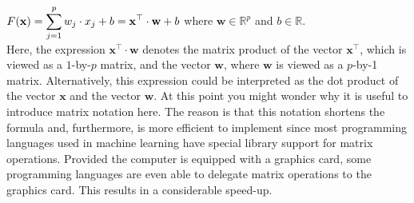 \\[0.2cm]
\hspace*{1.3cm}
$\displaystyle F(\mathbf{x}) = \sum\limits_{j=1}^p w_j \cdot x_j + b = \mathbf{x}^\top \cdot \mathbf{w} + b$ 
\quad where  $\mathbf{w} \in \mathbb{R}^p$ and $b\in\mathbb{R}$.
\\[0.2cm]
Here, the expression $\mathbf{x}^\top \cdot \mathbf{w}$ denotes the matrix product of the vector
$\mathbf{x}^\top$, which is viewed as a $1$-by-$p$ matrix, and the vector $\mathbf{w}$, where $\mathbf{w}$ is
viewed as a $p$-by-1 matrix.  Alternatively, this
expression could be interpreted as the dot product of the vector $\mathbf{x}$ and the vector $\mathbf{w}$.
At this point you might wonder why it is useful to introduce matrix notation here.  The reason is
that this notation shortens the formula and, furthermore, is more efficient to implement since most
programming languages used in machine learning have special library support for matrix operations.  
Provided the computer is equipped with a graphics card,  some
programming languages are even able to delegate matrix operations to the graphics card.  This results in a
considerable speed-up.

